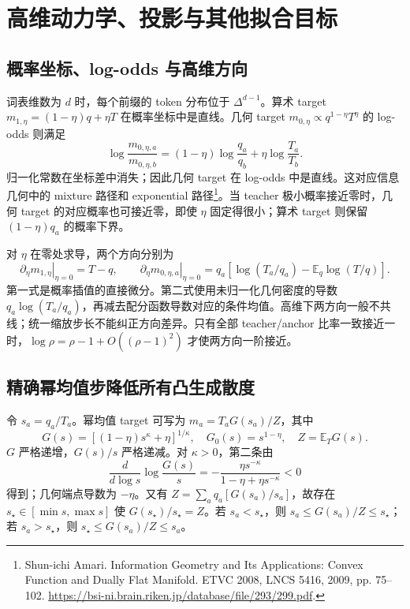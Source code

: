 \documentclass[lang=cn,scheme=chinese,openany]{../book/elegantbook}
\newcommand{\E}{\mathbb E}
\begin{document}


\section{高维动力学、投影与其他拟合目标}
\label{sec:power-projection}

\subsection{概率坐标、log-odds 与高维方向}

词表维数为 $d$ 时，每个前缀的 token 分布位于 $\Delta^{d-1}$。算术 target $m_{1,\eta}=(1-\eta)q+\eta T$ 在概率坐标中是直线。几何 target $m_{0,\eta}\propto q^{1-\eta}T^\eta$ 的 log-odds 则满足
\begin{equation}
 \log\frac{m_{0,\eta,a}}{m_{0,\eta,b}}
 =(1-\eta)\log\frac{q_a}{q_b}+\eta\log\frac{T_a}{T_b}.
\end{equation}
归一化常数在坐标差中消失；因此几何 target 在 log-odds 中是直线。这对应信息几何中的 mixture 路径和 exponential 路径\footnote{Shun-ichi Amari. Information Geometry and Its Applications: Convex Function and Dually Flat Manifold. ETVC 2008, LNCS 5416, 2009, pp. 75--102. \url{https://bsi-ni.brain.riken.jp/database/file/293/299.pdf}.}。当 teacher 极小概率接近零时，几何 target 的对应概率也可接近零，即使 $\eta$ 固定得很小；算术 target 则保留 $(1-\eta)q_a$ 的概率下界。

对 $\eta$ 在零处求导，两个方向分别为
\begin{equation}
 \left.\partial_\eta m_{1,\eta}\right|_{\eta=0}=T-q,\qquad
 \left.\partial_\eta m_{0,\eta,a}\right|_{\eta=0}
 =q_a[\log(T_a/q_a)-\E_q\log(T/q)].
\end{equation}
第一式是概率插值的直接微分。第二式使用未归一化几何密度的导数 $q_a\log(T_a/q_a)$，再减去配分函数导数对应的条件均值。高维下两方向一般不共线；统一缩放步长不能纠正方向差异。只有全部 teacher/anchor 比率一致接近一时，$\log\rho=\rho-1+O((\rho-1)^2)$ 才使两方向一阶接近。



\subsection{精确幂均值步降低所有凸生成散度}

令 $s_a=q_a/T_a$。幂均值 target 可写为 $m_a=T_aG(s_a)/Z$，其中
\begin{equation}
 G(s)=[(1-\eta)s^\kappa+\eta]^{1/\kappa},\quad
 G_0(s)=s^{1-\eta},\quad Z=\E_TG(s).
\end{equation}
$G$ 严格递增，$G(s)/s$ 严格递减。对 $\kappa>0$，第二条由
\begin{equation}
 \frac{d}{d\log s}\log\frac{G(s)}s
 =-\frac{\eta s^{-\kappa}}{1-\eta+\eta s^{-\kappa}}<0
\end{equation}
得到；几何端点导数为 $-\eta$。又有 $Z=\sum_aq_a[G(s_a)/s_a]$，故存在 $s_\star\in[\min s,\max s]$ 使 $G(s_\star)/s_\star=Z$。若 $s_a<s_\star$，则 $s_a\le G(s_a)/Z\le s_\star$；若 $s_a>s_\star$，则 $s_\star\le G(s_a)/Z\le s_a$。
\end{document}
